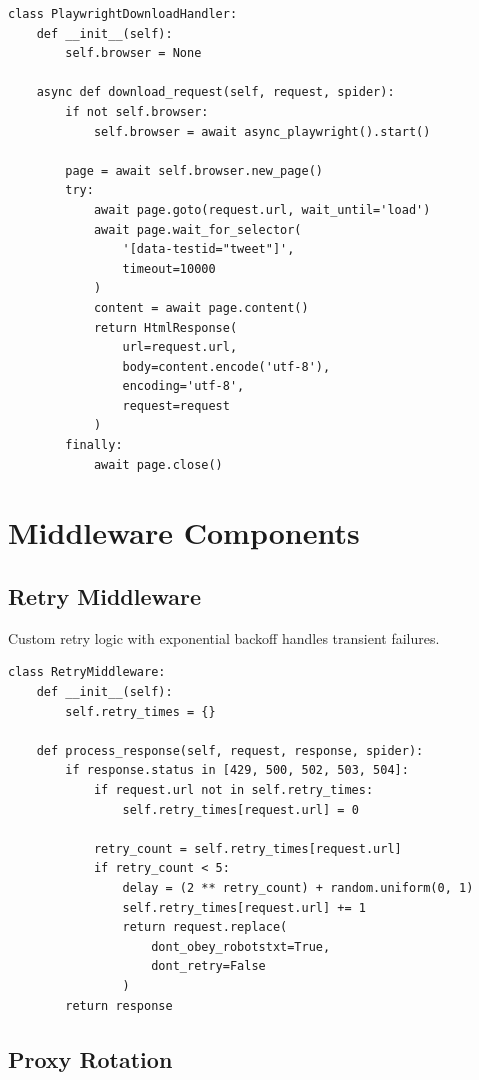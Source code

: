 \documentclass[12pt,a4paper]{report}
\begin{document}
\begin{lstlisting}
class PlaywrightDownloadHandler:
    def __init__(self):
        self.browser = None
    
    async def download_request(self, request, spider):
        if not self.browser:
            self.browser = await async_playwright().start()
        
        page = await self.browser.new_page()
        try:
            await page.goto(request.url, wait_until='load')
            await page.wait_for_selector(
                '[data-testid="tweet"]',
                timeout=10000
            )
            content = await page.content()
            return HtmlResponse(
                url=request.url,
                body=content.encode('utf-8'),
                encoding='utf-8',
                request=request
            )
        finally:
            await page.close()
\end{lstlisting}

\section{Middleware Components}

\subsection{Retry Middleware}

Custom retry logic with exponential backoff handles transient failures.

\begin{lstlisting}
class RetryMiddleware:
    def __init__(self):
        self.retry_times = {}
    
    def process_response(self, request, response, spider):
        if response.status in [429, 500, 502, 503, 504]:
            if request.url not in self.retry_times:
                self.retry_times[request.url] = 0
            
            retry_count = self.retry_times[request.url]
            if retry_count < 5:
                delay = (2 ** retry_count) + random.uniform(0, 1)
                self.retry_times[request.url] += 1
                return request.replace(
                    dont_obey_robotstxt=True,
                    dont_retry=False
                )
        return response
\end{lstlisting}

\subsection{Proxy Rotation}
\end{document}

